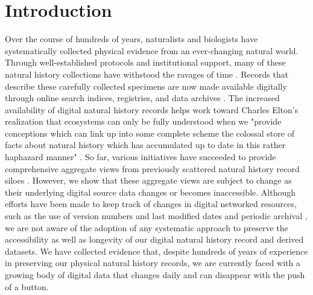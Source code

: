 
\section*{Introduction}
Over the course of hundreds of years, naturalists and biologists have systematically collected physical evidence from an ever-changing natural world. Through well-established protocols and institutional support, many of these natural history collections have withstood the ravages of time \citep{Hortal_2015,Davis_1996}. Records that describe these carefully collected specimens are now made available digitally through online search indices, registries, and data archives \citep{Page_2015}. The increased availability of digital natural history records helps work toward Charles Elton’s realization that ecosystems can only be fully understood when we "provide conceptions which can link up into some complete scheme the colossal store of facts about natural history which has accumulated up to date in this rather haphazard manner" \citep{Elton_1927}. So far, various initiatives have succeeded to provide comprehensive aggregate views from previously scattered natural history record siloes \citep{Rinaldo_2009,Michener_2011,Edwards_2000,matsunaga2013integrated,gbif_org_2019}. However, we show that these aggregate views are subject to change as their underlying digital source data changes or becomes inaccessible. Although efforts have been made to keep track of changes in digital networked resources, such as the use of version numbers and last modified dates \citep{Wieczorek_2012,Robertson_2014} and periodic archival \citep{Costello_2013},  we are not aware of the adoption of any systematic approach to preserve the accessibility as well as longevity of our digital natural history record and derived datasets. We have collected evidence that, despite hundreds of years of experience in preserving our physical natural history records, we are currently faced with a growing body of digital data that changes daily and can disappear with the push of a button.
